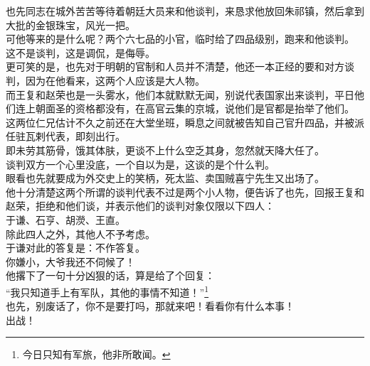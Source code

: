 \begin{multicols}{\theparacolNo}
也先同志在城外苦苦等待着朝廷大员来和他谈判，来恳求他放回朱祁镇，然后拿到大批的金银珠宝，风光一把。\\

可他等来的是什么呢？两个六七品的小官，临时给了四品级别，跑来和他谈判。\\

这不是谈判，这是调侃，是侮辱。\\

更可笑的是，也先对于明朝的官制和人员并不清楚，他还一本正经的要和对方谈判，因为在他看来，这两个人应该是大人物。\\

而王复和赵荣也是一头雾水，他们本就默默无闻，别说代表国家出来谈判，平日他们连上朝面圣的资格都没有，在高官云集的京城，说他们是官都是抬举了他们。\\

这两位仁兄估计不久之前还在大堂坐班，瞬息之间就被告知自己官升四品，并被派任驻瓦剌代表，即刻出行。\\

即未劳其筋骨，饿其体肤，更谈不上什么空乏其身，忽然就天降大任了。\\

谈判双方一个心里没底，一个自以为是，这谈的是个什么判。\\

眼看也先就要成为外交史上的笑柄，死太监、卖国贼喜宁先生又出场了。\\

他十分清楚这两个所谓的谈判代表不过是两个小人物，便告诉了也先，回报王复和赵荣，拒绝和他们谈，并表示他们的谈判对象仅限以下四人：\\

于谦、石亨、胡濙、王直。\\

除此四人之外，其他人不予考虑。\\

于谦对此的答复是：不作答复。\\

你嫌小，大爷我还不伺候了！\\

他撂下了一句十分凶狠的话，算是给了个回复：\\

“我只知道手上有军队，其他的事情不知道！”\footnote{今日只知有军旅，他非所敢闻。}\\

也先，别废话了，你不是要打吗，那就来吧！看看你有什么本事！\\

出战！\\


\end{multicols}
